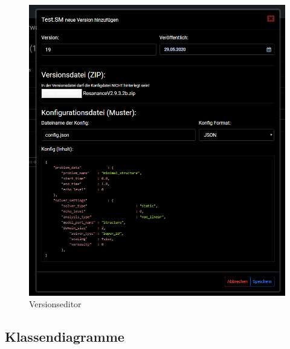\begin{center}
    \begin{figure}[H]
        \centering
        \includegraphics[scale=0.4]{content/attachments/s-ver-view.png}
        \caption{Versionseditor}
        \label{fig:s_ver_list}
    \end{figure}
\end{center}

\subsection{Klassendiagramme}
\label{app:class_concept}

